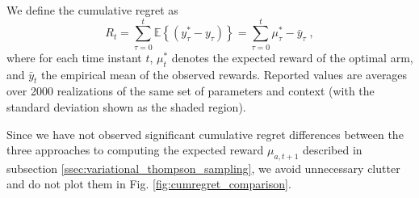 \documentclass{article}
\newcommand{\eValue}[1]{\mathbb{E}\left\{ #1 \right\}}
\begin{document}
We define the cumulative regret as
\begin{equation}
R_t=\sum_{\tau=0}^t \eValue{\left(y^*_{\tau}-y_{\tau} \right)} = \sum_{\tau=0}^t \mu_\tau^*-\bar{y}_{\tau} \; ,
\end{equation}
where for each time instant $t$, $\mu_t^*$ denotes the expected reward of the optimal arm, and $\bar{y}_{t}$ the empirical mean of the observed rewards. Reported values are averages over 2000 realizations of the same set of parameters and context (with the standard deviation shown as the shaded region).

Since we have not observed significant cumulative regret differences between the three approaches to computing the expected reward $\mu_{a,t+1}$ described in subsection \ref{ssec:variational_thompson_sampling}, we avoid unnecessary clutter and do not plot them in Fig. \ref{fig:cumregret_comparison}.
\end{document}
